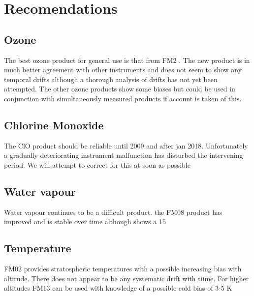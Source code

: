 \section{Recomendations}
\subsection{Ozone}
The best ozone product for general use is that from FM2 .  The new product is in much better agreement with other instruments and does not seem to show any temporal drifts although a thorough analysis of drifts has not yet been attempted.   The other ozone products show some biases 
but could be used in conjunction with simultaneously measured products if account is taken of this. 

\subsection{Chlorine Monoxide}

 The ClO product should be reliable until 2009 and after jan 2018. Unfortunately a gradually deteriorating instrument malfunction has disturbed the intervening period.  We will attempt to correct for this at soon as possible
 
 \subsection{Water vapour}
 Water vapour continues to be a difficult product. the FM08 product has improved and is stable over time although shows a 15 %
 \subsection{Temperature}
 
 FM02 provides stratospheric temperatures with a possible increasing bias with altitude. There does not appear to be any systematic drift with tiime.  For higher altitudes FM13 can be used with knowledge of a possible cold bias of 3-5 K
 
 

